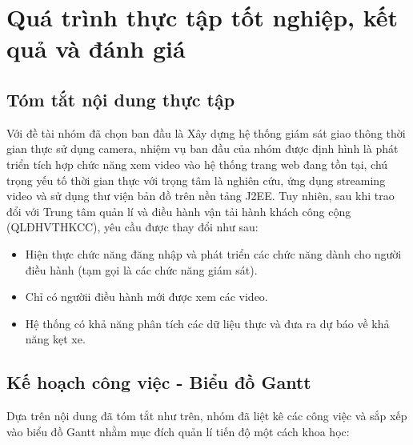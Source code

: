 \chapter{Quá trình thực tập tốt nghiệp, kết quả và đánh giá}
\section{Tóm tắt nội dung thực tập}
Với đề tài nhóm đã chọn ban đầu là Xây dựng hệ thống giám sát giao thông thời gian thực sử dụng camera, nhiệm vụ ban đầu của nhóm được định hình là phát triển tích hợp chức năng xem video vào hệ thống trang web đang tồn tại, chú trọng yếu tố thời gian thực với trọng tâm là nghiên cứu, ứng dụng streaming video và sử dụng thư viện bản đồ trên nền tảng J2EE. Tuy nhiên, sau khi trao đổi với Trung tâm quản lí và điều hành vận tải hành khách công cộng (QLĐHVTHKCC), yêu cầu được thay đổi như sau: 

\begin{itemize}
	\item Hiện thực chức năng đăng nhập và phát triển các chức năng dành cho người điều hành (tạm gọi là các chức năng giám sát).
	\item Chỉ có ngườii điều hành mới được xem các video.
	\item Hệ thống có khả năng phân tích các dữ liệu thực và đưa ra dự báo về khả năng kẹt xe.
\end{itemize}

\section{Kế hoạch công việc - Biểu đồ Gantt}
Dựa trên nội dung đã tóm tắt như trên, nhóm đã liệt kê các công việc và sắp xếp vào biểu đồ Gantt nhằm mục đích quản lí tiến độ một cách khoa học:

